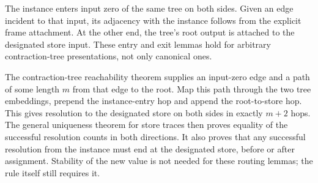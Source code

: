 





The instance enters input zero of the same tree on both sides. Given an
edge incident to that input, its adjacency with the instance follows from
the explicit frame attachment. At the other end, the tree's root output
is attached to the designated store input. These entry and exit lemmas
hold for arbitrary contraction-tree presentations, not only canonical ones.





The contraction-tree reachability theorem supplies an input-zero edge and
a path of some length $m$ from that edge to the root. Map this path through
the two tree embeddings, prepend the instance-entry hop and append the
root-to-store hop. This gives resolution to the designated store on both
sides in exactly $m+2$ hops. The general uniqueness theorem for store traces
then proves equality of the successful resolution counts in both directions.
It also proves that any successful resolution from the instance must end
at the designated store, before or after assignment. Stability of the new
value is not needed for these routing lemmas; the rule itself still requires it.





